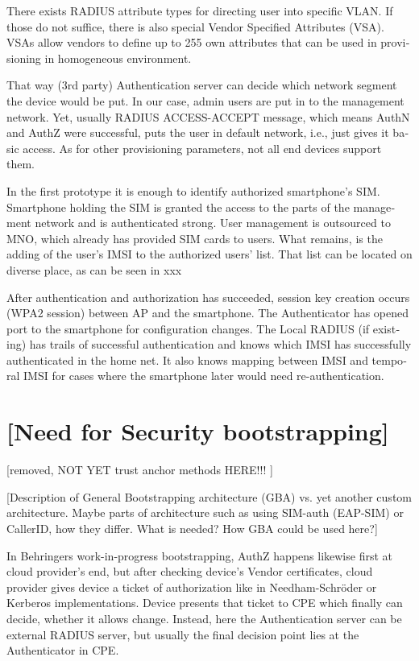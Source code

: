 \documentclass[12pt,a4paper,english]{tutthesis}
\begin{document}
\begin{otherlanguage}{english}
There exists RADIUS attribute types for directing user into specific
VLAN. If those do not suffice, there is also special Vendor Specified
Attributes (VSA). VSAs allow vendors to define up to 255 own
attributes that can be used in provisioning in homogeneous environment. 


That way (3rd party) Authentication server can decide which network
segment the device would be put.  In our case, admin users are put in
to the management network.  Yet, usually RADIUS ACCESS-ACCEPT message,
which means AuthN and AuthZ were successful,  puts the user in
default network, i.e., just gives it basic access. As for other
provisioning parameters, not all end devices support them.

In the first prototype it is enough to identify authorized
smartphone's SIM.  Smartphone holding the SIM is granted the access to
the parts of the management network and is authenticated strong.  User
management is outsourced to MNO, which
already has provided SIM cards to users. What remains, is the adding
of the user's IMSI to the authorized users' list. That list can be
located on diverse place, as can be seen in xxx


After authentication and authorization has succeeded, session key
creation occurs (WPA2 session) between AP and the smartphone. 
The Authenticator has opened port to the smartphone for
configuration changes. 
The Local RADIUS (if existing) has trails of successful
authentication and knows which IMSI has successfully authenticated in
the home net. It also knows mapping between IMSI and temporal IMSI for
cases where the smartphone later would need re-authentication.



\section{[Need for Security bootstrapping]}
\label{sec-4-4}
[removed, NOT YET trust anchor methods HERE!!! ]



[Description of General Bootstrapping architecture (GBA) vs. yet
another custom architecture. Maybe parts of architecture
such as using SIM-auth (EAP-SIM) or CallerID, how they differ. 
What is needed? How GBA could be used here?]


In Behringers work-in-progress  bootstrapping\cite{draft-behringer-bootstrap},
AuthZ happens likewise first at cloud provider's
end, but after checking device's Vendor certificates, cloud provider
gives device a ticket of authorization like in Needham-Schröder or
Kerberos implementations. Device presents that ticket to CPE which
finally can decide, whether it allows change. 
Instead, here the Authentication server can be external RADIUS server,
but usually the final decision point lies at the Authenticator in CPE.



\end{otherlanguage}
\end{document}
